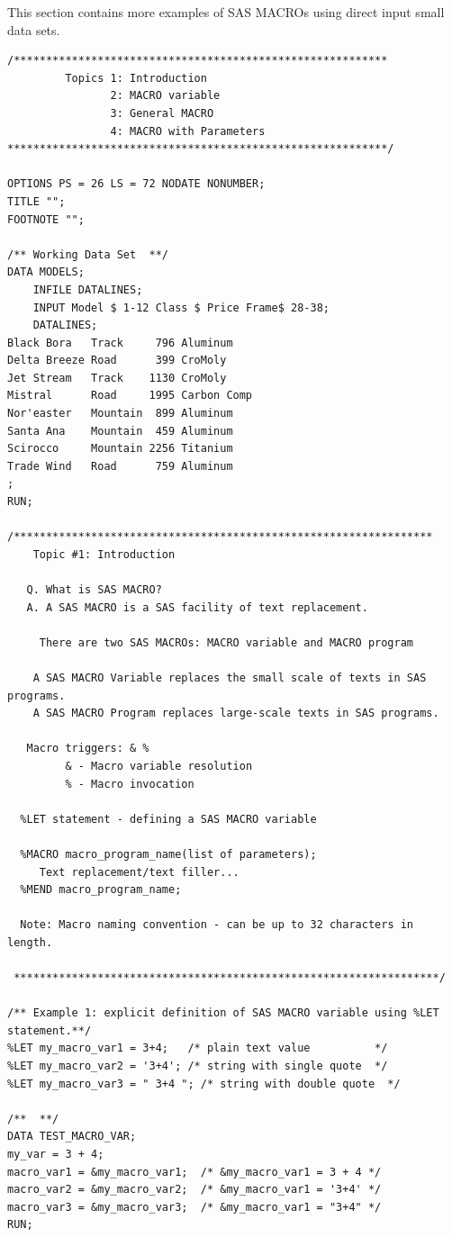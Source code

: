 \documentclass[
]{book}
\begin{document}
This section contains more examples of SAS MACROs using direct input small data sets.

\begin{verbatim}
/**********************************************************
         Topics 1: Introduction
                2: MACRO variable
                3: General MACRO
                4: MACRO with Parameters
***********************************************************/

OPTIONS PS = 26 LS = 72 NODATE NONUMBER;
TITLE "";
FOOTNOTE "";

/** Working Data Set  **/
DATA MODELS;
    INFILE DATALINES;
    INPUT Model $ 1-12 Class $ Price Frame$ 28-38;
    DATALINES;
Black Bora   Track     796 Aluminum
Delta Breeze Road      399 CroMoly
Jet Stream   Track    1130 CroMoly
Mistral      Road     1995 Carbon Comp
Nor'easter   Mountain  899 Aluminum
Santa Ana    Mountain  459 Aluminum
Scirocco     Mountain 2256 Titanium
Trade Wind   Road      759 Aluminum
;
RUN;

/*****************************************************************
    Topic #1: Introduction
   
   Q. What is SAS MACRO?
   A. A SAS MACRO is a SAS facility of text replacement.

     There are two SAS MACROs: MACRO variable and MACRO program

    A SAS MACRO Variable replaces the small scale of texts in SAS programs.
    A SAS MACRO Program replaces large-scale texts in SAS programs.
     
   Macro triggers: & %
         & - Macro variable resolution
         % - Macro invocation 
 
  %LET statement - defining a SAS MACRO variable

  %MACRO macro_program_name(list of parameters);
     Text replacement/text filler...
  %MEND macro_program_name;  

  Note: Macro naming convention - can be up to 32 characters in length. 

 ******************************************************************/

/** Example 1: explicit definition of SAS MACRO variable using %LET statement.**/
%LET my_macro_var1 = 3+4;   /* plain text value          */
%LET my_macro_var2 = '3+4'; /* string with single quote  */
%LET my_macro_var3 = " 3+4 "; /* string with double quote  */

/**  **/
DATA TEST_MACRO_VAR;
my_var = 3 + 4;
macro_var1 = &my_macro_var1;  /* &my_macro_var1 = 3 + 4 */
macro_var2 = &my_macro_var2;  /* &my_macro_var1 = '3+4' */
macro_var3 = &my_macro_var3;  /* &my_macro_var1 = "3+4" */
RUN;


\end{verbatim}
\end{document}

